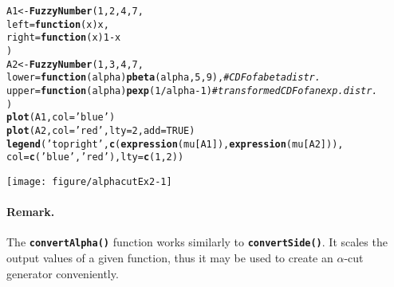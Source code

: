 \documentclass[11pt]{article}\usepackage[]{graphicx}\usepackage[]{color}
\makeatletter
\newcommand{\hlnum}[1]{\textcolor[rgb]{0.686,0.059,0.569}{#1}}%
\newcommand{\hlstr}[1]{\textcolor[rgb]{0.192,0.494,0.8}{#1}}%
\newcommand{\hlcom}[1]{\textcolor[rgb]{0.678,0.584,0.686}{\textit{#1}}}%
\newcommand{\hlopt}[1]{\textcolor[rgb]{0,0,0}{#1}}%
\newcommand{\hlstd}[1]{\textcolor[rgb]{0.345,0.345,0.345}{#1}}%
\newcommand{\hlkwa}[1]{\textcolor[rgb]{0.161,0.373,0.58}{\textbf{#1}}}%
\newcommand{\hlkwb}[1]{\textcolor[rgb]{0.69,0.353,0.396}{#1}}%
\newcommand{\hlkwc}[1]{\textcolor[rgb]{0.333,0.667,0.333}{#1}}%
\newcommand{\hlkwd}[1]{\textcolor[rgb]{0.737,0.353,0.396}{\textbf{#1}}}%
\newenvironment{kframe}{%
 \def\at@end@of@kframe{}%
 \ifinner\ifhmode%
  \def\at@end@of@kframe{\end{minipage}}%
  \begin{minipage}{\columnwidth}%
 \fi\fi%
 \def\FrameCommand##1{\hskip\@totalleftmargin \hskip-\fboxsep
 \colorbox{shadecolor}{##1}\hskip-\fboxsep
     \hskip-\linewidth \hskip-\@totalleftmargin \hskip\columnwidth}%
 \MakeFramed {\advance\hsize-\width
   \@totalleftmargin\z@ \linewidth\hsize
   \@setminipage}}%
 {\par\unskip\endMakeFramed%
 \at@end@of@kframe}
\newenvironment{knitrout}{}{} %
\newcommand{\func}[1]{\texttt{\hlkwd{#1}}}
\makeatother
\begin{document}
\begin{knitrout}\small
{}\color{fgcolor}\begin{kframe}
\begin{alltt}
\hlstd{A1} \hlkwb{<-} \hlkwd{FuzzyNumber}\hlstd{(}\hlnum{1}\hlstd{,} \hlnum{2}\hlstd{,} \hlnum{4}\hlstd{,} \hlnum{7}\hlstd{,}
    \hlkwc{left}\hlstd{=}\hlkwa{function}\hlstd{(}\hlkwc{x}\hlstd{) x,}
   \hlkwc{right}\hlstd{=}\hlkwa{function}\hlstd{(}\hlkwc{x}\hlstd{)} \hlnum{1}\hlopt{-}\hlstd{x}
\hlstd{)}
\hlstd{A2} \hlkwb{<-} \hlkwd{FuzzyNumber}\hlstd{(}\hlnum{1}\hlstd{,} \hlnum{3}\hlstd{,} \hlnum{4}\hlstd{,} \hlnum{7}\hlstd{,}
   \hlkwc{lower}\hlstd{=}\hlkwa{function}\hlstd{(}\hlkwc{alpha}\hlstd{)} \hlkwd{pbeta}\hlstd{(alpha,} \hlnum{5}\hlstd{,} \hlnum{9}\hlstd{),} \hlcom{# CDF of a beta distr.}
   \hlkwc{upper}\hlstd{=}\hlkwa{function}\hlstd{(}\hlkwc{alpha}\hlstd{)} \hlkwd{pexp}\hlstd{(}\hlnum{1}\hlopt{/}\hlstd{alpha}\hlopt{-}\hlnum{1}\hlstd{)} \hlcom{# transformed CDF of an exp. distr.}
\hlstd{)}
\hlkwd{plot}\hlstd{(A1,} \hlkwc{col}\hlstd{=}\hlstr{'blue'}\hlstd{)}
\hlkwd{plot}\hlstd{(A2,} \hlkwc{col}\hlstd{=}\hlstr{'red'}\hlstd{,} \hlkwc{lty}\hlstd{=}\hlnum{2}\hlstd{,} \hlkwc{add}\hlstd{=}\hlnum{TRUE}\hlstd{)}
\hlkwd{legend}\hlstd{(}\hlstr{'topright'}\hlstd{,} \hlkwd{c}\hlstd{(}\hlkwd{expression}\hlstd{(mu[A1]),} \hlkwd{expression}\hlstd{(mu[A2])),}
   \hlkwc{col}\hlstd{=}\hlkwd{c}\hlstd{(}\hlstr{'blue'}\hlstd{,} \hlstr{'red'}\hlstd{),} \hlkwc{lty}\hlstd{=}\hlkwd{c}\hlstd{(}\hlnum{1}\hlstd{,}\hlnum{2}\hlstd{))}
\end{alltt}
\end{kframe}
\end{knitrout}

\begin{center}
\begin{knitrout}\small
{}\color{fgcolor}

{\centering \texttt{[image: figure/alphacutEx2-1]} 

}



\end{knitrout}
\end{center}




\paragraph{Remark.}
The \func{convertAlpha()} function
works similarly to \func{convertSide()}.
It scales the output values
of a given function, thus it may be used to create
an $\alpha$-cut generator conveniently.
\end{document}
